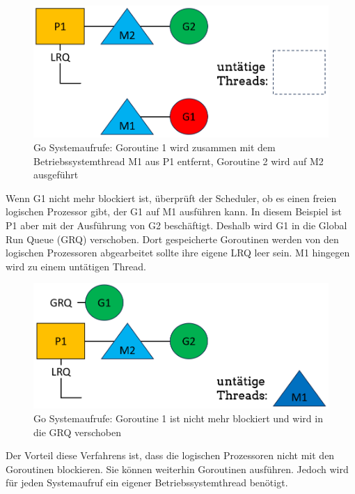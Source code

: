 \documentclass[fontsize=12pt,paper=a4,twoside=semi,parskip=half-,headsepline,headinclude]{scrreprt}
\begin{document}
\begin{figure}[H]
	\centering
	\includegraphics[scale=0.5]{figures/GoroutineSystemaufrufe2.png}
	\caption{Go Systemaufrufe: Goroutine 1 wird zusammen mit dem Betriebssystemthread M1 aus P1 entfernt, Goroutine 2 wird auf M2 ausgeführt}
	\label{fig:GoroutineSystemaufrufe2}
\end{figure}

Wenn G1 nicht mehr blockiert ist, überprüft der Scheduler, ob es einen freien logischen Prozessor gibt, der G1 auf M1 ausführen kann. In diesem Beispiel ist P1 aber mit der Ausführung von G2 beschäftigt. Deshalb wird G1 in die Global Run Queue (GRQ) verschoben. Dort gespeicherte Goroutinen werden von den logischen Prozessoren abgearbeitet sollte ihre eigene LRQ leer sein. M1 hingegen wird zu einem untätigen Thread.

\begin{figure}[H]
	\centering
	\includegraphics[scale=0.5]{figures/GoroutineSystemaufrufe3.png}
	\caption{Go Systemaufrufe: Goroutine 1 ist nicht mehr blockiert und wird in die GRQ verschoben}
	\label{fig:GoroutineSystemaufrufe3}
\end{figure}

Der Vorteil diese Verfahrens ist, dass die logischen Prozessoren nicht mit den Goroutinen blockieren. Sie können weiterhin Goroutinen ausführen. Jedoch wird für jeden Systemaufruf ein eigener Betriebssystemthread benötigt.
\end{document}
